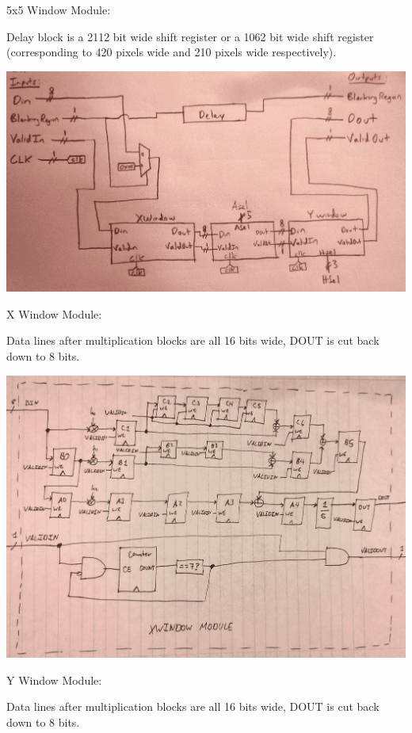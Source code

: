 \documentclass[11pt]{article}
\begin{document}
\newpage

5x5 Window Module:

Delay block is a 2112 bit wide shift register or a 1062 bit wide shift register (corresponding to 420 pixels wide and 210 pixels wide respectively). \newline

\noindent\includegraphics[width=\textwidth]{modules/proc5x5window.png}

\newpage
X Window Module:

Data lines after multiplication blocks are all 16 bits wide, DOUT is cut
back down to 8 bits. \newline

\noindent\includegraphics[width=\textwidth]{modules/procx_window.png}

\newpage 

Y Window Module:

Data lines after multiplication blocks are all 16 bits wide, DOUT is cut
back down to 8 bits. \newline
\end{document}
